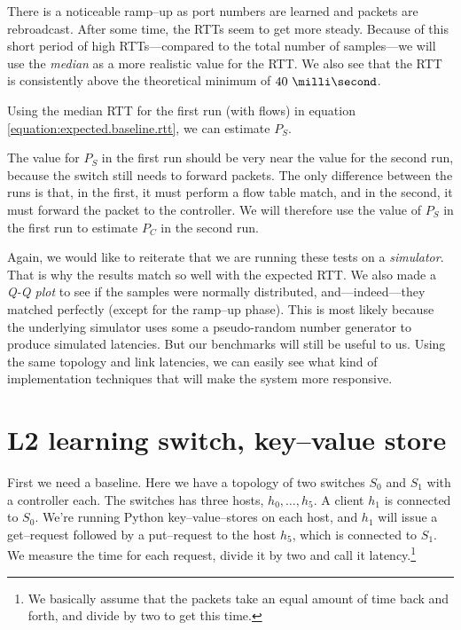 

There is a noticeable ramp--up as port numbers are learned and packets are
rebroadcast.  After some time, the RTTs seem to get more steady.
Because of this short period of high RTTs---compared to the total number of
samples---we will use the \textit{median} as a more realistic value for the
RTT. We also see that the RTT is consistently above the theoretical minimum
of $\ms{40}$.

Using the median RTT for the first run (with flows)
in equation \ref{equation:expected.baseline.rtt}, we can estimate $P_S$.



The value for $P_S$ in the first run should be very near the value for the
second run, because the switch still needs to forward packets.  The only
difference between the runs is that, in the first, it must perform a flow
table match, and in the second, it must forward the packet to the
controller.  We will therefore use the value of $P_S$ in the first run to
estimate $P_C$ in the second run.



Again, we would like to reiterate that we are running these tests on a
\textit{simulator}.  That is why the results match so well with the expected
\acs{RTT}.  We also made a \textit{Q-Q plot} to see if the samples were
normally distributed, and---indeed---they matched perfectly (except for the
ramp--up phase).  This is most likely because the
underlying simulator uses some a pseudo-random number generator to
produce simulated latencies.  But our benchmarks will still be useful to us.
Using the same topology and link latencies, we can easily see what kind of
implementation techniques that will make the system more responsive.

\section{L2 learning switch, key--value store}
\label{chapter:benchmark.l2.kv.noflows}

First we need a baseline.  Here we have a topology of two switches $S_0$ and
$S_1$ with a controller each.  The switches has three hosts, $h_0, \dots, h_5$.
A client $h_1$ is connected to $S_0$. We're running Python
key--value--stores on each host, and $h_1$ will issue a get--request
followed by a put--request to the host $h_5$, which is connected to $S_1$.
We measure the time for each request, divide it
by two and call it latency.\footnote{We basically assume that the packets
take an equal amount of time back and forth, and divide by two to get this
time.}

